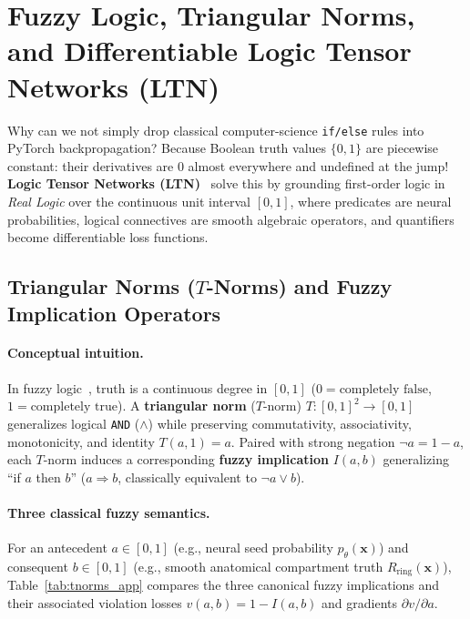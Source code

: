 \documentclass[10pt,a4paper]{article}
\renewcommand{\_}{\origunderscore\allowbreak}
\begin{document}
\section[Fuzzy Logic, $T$-Norms \& LTN Quantifiers]{Fuzzy Logic, Triangular Norms, and Differentiable Logic Tensor Networks (LTN)}
\label{app:ltn}

Why can we not simply drop classical computer-science \texttt{if/else} rules into PyTorch backpropagation? Because Boolean truth values $\{0, 1\}$ are piecewise constant: their derivatives are $0$ almost everywhere and undefined at the jump! \textbf{Logic Tensor Networks (LTN)}~\cite{badreddine2022ltn,garcez2023neurosymbolic} solve this by grounding first-order logic in \emph{Real Logic} over the continuous unit interval $[0, 1]$, where predicates are neural probabilities, logical connectives are smooth algebraic operators, and quantifiers become differentiable loss functions.

\subsection{Triangular Norms ($T$-Norms) and Fuzzy Implication Operators}

\paragraph{Conceptual intuition.} In fuzzy logic~\cite{klement2000tnorms}, truth is a continuous degree in $[0, 1]$ ($0 = \text{completely false}$, $1 = \text{completely true}$). A \textbf{triangular norm} ($T$-norm) $T : [0,1]^2 \to [0,1]$ generalizes logical \texttt{AND} ($\land$) while preserving commutativity, associativity, monotonicity, and identity $T(a, 1) = a$. Paired with strong negation $\neg a = 1 - a$, each $T$-norm induces a corresponding \textbf{fuzzy implication} $I(a, b)$ generalizing ``if $a$ then $b$'' ($a \Rightarrow b$, classically equivalent to $\neg a \lor b$).

\paragraph{Three classical fuzzy semantics.} For an antecedent $a \in [0, 1]$ (e.g., neural seed probability $p_\theta(\mathbf{x})$) and consequent $b \in [0, 1]$ (e.g., smooth anatomical compartment truth $R_{\text{ring}}(\mathbf{x})$), Table~\ref{tab:tnorms_app} compares the three canonical fuzzy implications and their associated violation losses $v(a, b) = 1 - I(a, b)$ and gradients $\partial v / \partial a$.
\end{document}
